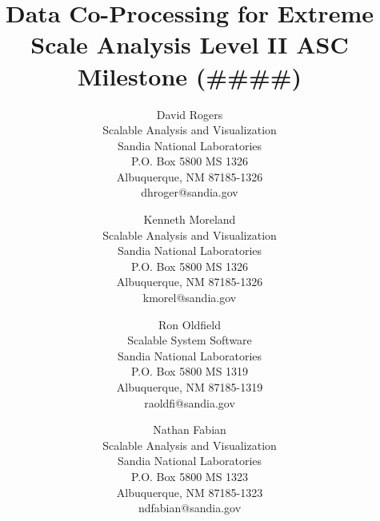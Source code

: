 \documentclass[12pt]{SANDreport}
\title{Data Co-Processing for Extreme Scale Analysis Level II ASC Milestone (\#\#\#\#)}
\author{
  David Rogers \\
  Scalable Analysis and Visualization \\
  Sandia National Laboratories \\
  P.O. Box 5800 MS 1326 \\
  Albuquerque, NM 87185-1326 \\
  dhroger@sandia.gov
  \and
  Kenneth Moreland \\
  Scalable Analysis and Visualization \\
  Sandia National Laboratories \\
  P.O. Box 5800 MS 1326 \\
  Albuquerque, NM 87185-1326 \\
  kmorel@sandia.gov
  \and
  Ron Oldfield \\
  Scalable System Software \\
  Sandia National Laboratories \\
  P.O. Box 5800 MS 1319 \\
  Albuquerque, NM 87185-1319 \\
  raoldfi@sandia.gov
  \and
  Nathan Fabian \\
  Scalable Analysis and Visualization \\
  Sandia National Laboratories \\
  P.O. Box 5800 MS 1323 \\
  Albuquerque, NM 87185-1323 \\
  ndfabian@sandia.gov
}
\date{}             %
\begin{document}
\sloppy

\maketitle

%





%
\cleardoublepage            %
\tableofcontents
\listoffigures
\listoftables




\clearpage





%
\SANDmain           %
\end{document}
